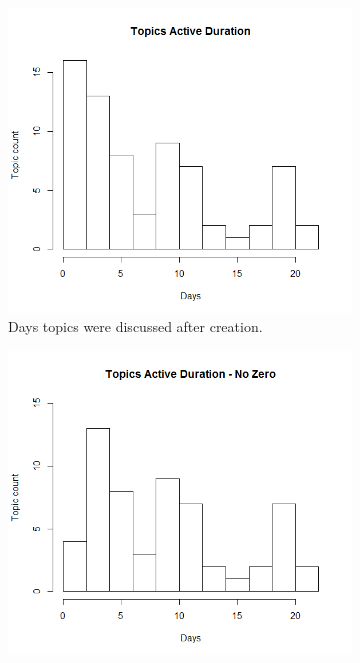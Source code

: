   \begin{figure}
  \centering
    \begin{subfigure}[b]{0.4\textwidth}
      \includegraphics[width=\textwidth]{topic_days_active.png}
      \caption{Days topics were discussed after creation.}
    \end{subfigure}
    \begin{subfigure}[b]{0.4\textwidth}
      \includegraphics[width=\textwidth]{topic_days_active_nz.png}

\end{subfigure}
\end{figure}
